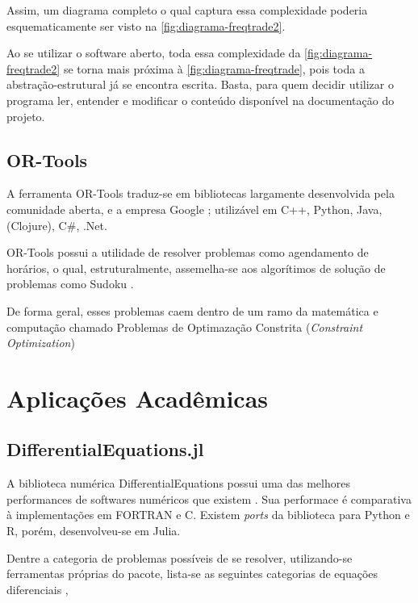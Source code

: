 \documentclass[
12pt,				%
openright,			%
oneside,			%
a4paper,			%
english,			%
french,				%
spanish,			%
brazil,				%
]{abntex2}
\begin{document}
Assim, um diagrama completo o qual captura essa complexidade poderia
esquematicamente ser visto na \autoref{fig:diagrama-freqtrade2}.

Ao se utilizar o software aberto, toda essa complexidade da
\autoref{fig:diagrama-freqtrade2} se torna mais próxima à
\autoref{fig:diagrama-freqtrade}, pois toda a abstração-estrutural já
se encontra escrita. Basta, para quem decidir utilizar o programa ler,
entender e modificar o conteúdo disponível na documentação do projeto.



\subsection{OR-Tools}
\label{sec:ortools}

A ferramenta OR-Tools traduz-se em bibliotecas largamente desenvolvida
pela comunidade aberta, e a empresa Google \cite{}; utilizável em C++,
Python, Java, (Clojure), C\#, .Net.

OR-Tools possui a utilidade de resolver problemas como agendamento de
horários, o qual, estruturalmente, assemelha-se aos algorítimos de
solução de problemas como Sudoku \cite{}.

De forma geral, esses problemas caem dentro de um ramo da matemática e
computação chamado Problemas de Optimazação Constrita
(\textit{Constraint Optimization})

\section{Aplicações Acadêmicas}

\subsection{DifferentialEquations.jl}

A biblioteca numérica DifferentialEquations possui uma das melhores performances de softwares numéricos que existem \cite{rackauckas2017differentialequations}. Sua performace é comparativa à implementações em FORTRAN e C. Existem \textit{ports} da biblioteca para Python e R, porém, desenvolveu-se em Julia.

Dentre a categoria de problemas possíveis de se resolver, utilizando-se ferramentas próprias do pacote, lista-se  as seguintes categorias de equações diferenciais \cite{rackauckas2019confederated,rackauckas2017adaptive,rackauckas_stability-optimized_2018,sykora2020stochasticdelaydiffeq,rackauckas2018comparison,rackauckas2019diffeqflux,rackauckas2020universal,gowda2019sparsity,ma2021modelingtoolkit},
\end{document}
